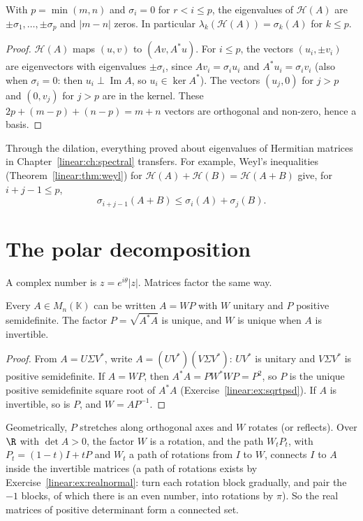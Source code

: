 \begin{proposition}\label{linear:prop:dilation}
With $p=\min(m,n)$ and $\sigma_i=0$ for $r<i\le p$, the eigenvalues of $\mathcal H(A)$ are $\pm\sigma_1,\dots,\pm\sigma_p$ and
$|m-n|$ zeros. In particular $\lambda_k(\mathcal H(A))=\sigma_k(A)$ for $k\le p$.
\end{proposition}
\begin{proof}
$\mathcal H(A)$ maps $(u,v)$ to $(Av,A^*u)$. For $i\le p$, the vectors $(u_i,\pm v_i)$ are eigenvectors with eigenvalues
$\pm\sigma_i$, since $Av_i=\sigma_iu_i$ and $A^*u_i=\sigma_iv_i$ (also when $\sigma_i=0$: then $u_i\perp\operatorname{Im}A$, so
$u_i\in\ker A^*$). The vectors $(u_j,0)$ for $j>p$ and $(0,v_j)$ for $j>p$ are in the kernel. These $2p+(m-p)+(n-p)=m+n$
vectors are orthogonal and non-zero, hence a basis.
\end{proof}

Through the dilation, everything proved about eigenvalues of Hermitian matrices in Chapter~\ref{linear:ch:spectral} transfers. For
example, Weyl's inequalities (Theorem~\ref{linear:thm:weyl}) for $\mathcal H(A)+\mathcal H(B)=\mathcal H(A+B)$ give, for $i+j-1\le
p$,
\begin{equation}\label{linear:eq:weylsv}
\sigma_{i+j-1}(A+B)\le\sigma_i(A)+\sigma_j(B).
\end{equation}

\section{The polar decomposition}

A complex number is $z=e^{i\theta}|z|$. Matrices factor the same way.

\begin{theorem}\label{linear:thm:polar}
Every $A\in M_n(\mathbb K)$ can be written $A=WP$ with $W$ unitary and $P$ positive semidefinite. The factor
$P=\sqrt{A^*A}$ is unique, and $W$ is unique when $A$ is invertible.
\end{theorem}
\begin{proof}
From $A=U\Sigma V^*$, write $A=(UV^*)(V\Sigma V^*)$: $UV^*$ is unitary and $V\Sigma V^*$ is positive semidefinite. If $A=WP$, then
$A^*A=PW^*WP=P^2$, so $P$ is the unique positive semidefinite square root of $A^*A$ (Exercise~\ref{linear:ex:sqrtpsd}). If $A$ is
invertible, so is $P$, and $W=AP^{-1}$.
\end{proof}

Geometrically, $P$ stretches along orthogonal axes and $W$ rotates (or reflects). Over $\R$ with $\det A>0$, the factor
$W$ is a rotation, and the path $W_tP_t$, with $P_t=(1-t)I+tP$ and $W_t$ a path of rotations from $I$ to $W$, connects $I$ to
$A$ inside the invertible matrices (a path of rotations exists by Exercise~\ref{linear:ex:realnormal}: turn each rotation block
gradually, and pair the $-1$ blocks, of which there is an even number, into rotations by $\pi$). So the real matrices of
positive determinant form a connected set.

